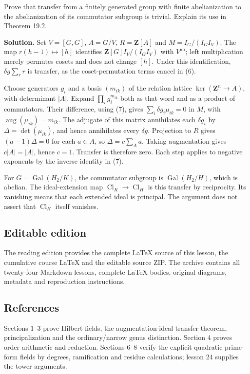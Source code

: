 \documentclass[11pt,a4paper]{article}
\begin{document}
Prove that transfer from a finitely generated group with finite
abelianization to the abelianization of its commutator subgroup is
trivial. Explain its use in Theorem 19.2.

\textbf{Solution.} Set \(V=[G,G]\), \(A=G/V\), \(R=\mathbf Z[A]\) and
\(M=I_G/(I_GI_V)\). The map \(r(h-1)\mapsto[h]\) identifies
\(\mathbf Z[G]I_V/(I_GI_V)\) with \(V^{\mathrm{ab}}\); left
multiplication merely permutes cosets and does not change \([h]\). Under
this identification, \(\delta g\sum_r r\) is transfer, as the
coset-permutation terms cancel in (6).

Choose generators \(g_i\) and a basis \((m_{ik})\) of the relation
lattice \(\ker(\mathbf Z^n\to A)\), with determinant \(|A|\). Expand
\(\prod_i g_i^{m_{ik}}\) both as that word and as a product of
commutators. Their difference, using (7), gives
\(\sum_i\delta g_i\mu_{ik}=0\) in \(M\), with
\(\operatorname{aug}(\mu_{ik})=m_{ik}\). The adjugate of this matrix
annihilates each \(\delta g_i\) by \(\Delta=\det(\mu_{ik})\), and hence
annihilates every \(\delta g\). Projection to \(R\) gives
\((a-1)\Delta=0\) for each \(a\in A\), so \(\Delta=c\sum_A a\). Taking
augmentation gives \(c|A|=|A|\), hence \(c=1\). Transfer is therefore
zero. Each step applies to negative exponents by the inverse identity in
(7).

For \(G=\operatorname{Gal}(H_2/K)\), the commutator subgroup is
\(\operatorname{Gal}(H_2/H)\), which is abelian. The ideal-extension map
\(\operatorname{Cl}_K\to\operatorname{Cl}_H\) is this transfer by
reciprocity. Its vanishing means that each extended ideal is principal.
The argument does not assert that \(\operatorname{Cl}_H\) itself
vanishes.

\subsection{Editable edition}\label{editable-edition}

The reading edition provides the complete LaTeX source of this lesson,
the cumulative course LaTeX and the editable source ZIP. The archive
contains all twenty-four Markdown lessons, complete LaTeX bodies,
original diagrams, metadata and reproduction instructions.

\subsection{References}\label{references}

Sections 1--3 prove Hilbert fields, the augmentation-ideal transfer
theorem, principalization and the ordinary/narrow genus distinction.
Section 4 proves order arithmetic and reduction. Sections 6--8 verify
the explicit quadratic prime-form fields by degrees, ramification and
residue calculations; lesson 24 supplies the tower arguments.
\end{document}
